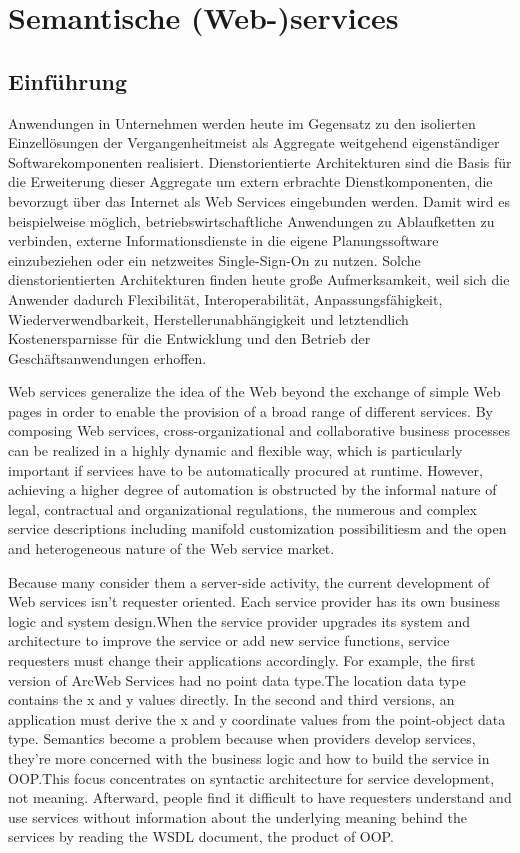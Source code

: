 \section{Semantische (Web-)services}
\label{l:sem-web-ser}
\subsection{Einführung}

Anwendungen in Unternehmen werden heute im Gegensatz zu den isolierten Einzellösungen
der Vergangenheitmeist als Aggregate weitgehend eigenständiger Softwarekomponenten realisiert.
Dienstorientierte Architekturen sind die Basis für die Erweiterung dieser Aggregate um
extern erbrachte Dienstkomponenten, die bevorzugt über das Internet als Web Services eingebunden
werden. Damit wird es beispielweise möglich, betriebswirtschaftliche Anwendungen zu
Ablaufketten zu verbinden, externe Informationsdienste in die eigene Planungssoftware einzubeziehen
oder ein netzweites Single-Sign-On zu nutzen. Solche dienstorientierten Architekturen
finden heute große Aufmerksamkeit, weil sich die Anwender dadurch Flexibilität, Interoperabilität,
Anpassungsfähigkeit, Wiederverwendbarkeit, Herstellerunabhängigkeit und letztendlich
Kostenersparnisse für die Entwicklung und den Betrieb der Geschäftsanwendungen erhoffen. \cite{addo}

Web services generalize the idea of the Web beyond the exchange of simple Web pages in order to enable the provision of a broad range of different services. By composing Web services, cross-organizational and collaborative business processes can be realized in a highly dynamic and flexible way, which is particularly important if services have to be automatically procured at runtime. However, achieving a higher degree of automation is obstructed by the informal nature of legal, contractual and organizational regulations, the numerous and complex service descriptions including manifold customization possibilitiesm and the open and heterogeneous nature of the Web service market.

Because many consider them a server-side activity, the
current development of Web services isn’t requester oriented.
Each service provider has its own business logic and
system design.When the service provider upgrades its system
and architecture to improve the service or add new
service functions, service requesters must change their
applications accordingly. For example, the first version of
ArcWeb Services had no point data type.The location data
type contains the x and y values directly. In the second and
third versions, an application must derive the x and y coordinate
values from the point-object data type. Semantics
become a problem because when providers develop services,
they’re more concerned with the business logic and
how to build the service in OOP.This focus concentrates
on syntactic architecture for service development, not
meaning. Afterward, people find it difficult to have
requesters understand and use services without information
about the underlying meaning behind the services by
reading the WSDL document, the product of OOP. \cite{shi1}

